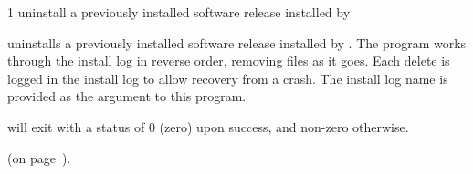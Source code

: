 \begin{ManPage}{\label{man-cleanup-release}}{1}
{uninstall a previously installed software release installed by   } 


\Synopsis {}


\Description {} uninstalls a previously installed
software release installed by .  The program
works through the install log in reverse order, removing files as it goes.
Each delete is logged in the install log to allow recovery from a
crash.  The install log name is provided as the 
argument to this program.

\begin{Options}
\end{Options}

\ExitStatus
{} will exit with a status of 0 (zero) upon success,
and non-zero otherwise.

\SeeAlso
{} (on page~\pageref{man-install-release}).

\end{ManPage}
